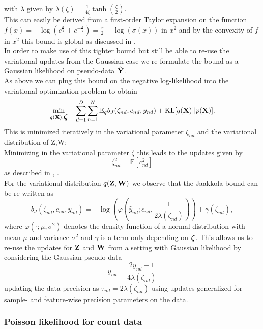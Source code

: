 with $\lambda$ given by $\lambda(\zeta)=\frac{1}{4\zeta}\tanh\left(\frac{\zeta}{2}\right)$.\\
This can easily be derived from a first-order Taylor expansion on the function $f(x) = - \log(e^{\frac{x}{2}}+e^{-\frac{x}{2}}) = \frac{x}{2}-\log(\sigma(x))$ in $x^2$ and by the convexity of 
$f$ in $x^2$ this bound is global as discussed in \cite{Jaakkola2000}.\\
In order to make use of this tighter bound but still be able to re-use the variational updates from the Gaussian case we re-formulate the bound as a Gaussian likelihood on pseudo-data $\hat{{\bf Y}}$.\\
As above we can plug this bound on the negative log-likelihood into the variational optimization problem to obtain  \begin{equation*}
\min_{q({\bf X}),\mbox{\boldmath $\zeta$}} \quad \sum_{d=1}^{D}\sum_{n=1}^{N} \mathbb{E}_q b_J(\zeta_{nd}, c_{nd},y_{nd} ) + {\rm KL}[q({\bf X})||p({\bf X})].
\end{equation*}
This is minimized iteratively in the variational parameter $\zeta_{nd}$ and the variational distribution of Z,W:\\
Minimizing in the variational parameter $\zeta$ this leads to the updates given by
\begin{equation*}
	\zeta_{nd}^2 = \mathbb{E}[c_{nd}^2]
\end{equation*}
as described in \cite{Jaakkola2000}, \cite{Bishop2006}.\\
For the variational distribution $q({\bf Z},{\bf W})$ we observe that the Jaakkola bound can be re-written as 
\begin{equation*}
	b_J(\zeta_{nd}, c_{nd},y_{nd} ) = -\log\left(\varphi\left(\hat{y}_{nd}; c_{nd}, \frac{1}{2\lambda(\zeta_{nd})}\right)\right) + \gamma(\zeta_{nd}),
\end{equation*}
where $\varphi(\cdot; \mu, \sigma^2)$ denotes the density function of a normal distribution with mean $\mu$ and variance $\sigma^2$ and $\gamma$ is a term only depending on $\mbox{\boldmath $\zeta$}$. This allows us to re-use the updates for ${\bf Z}$ and ${\bf W}$ from a setting with Gaussian likelihood by considering the Gaussian pseudo-data 
\begin{equation*}
	\hat{y}_{nd}= \frac{2y_{nd}-1}{4 \lambda(\zeta_{nd})}
\end{equation*}
updating the data precision as $\tau_{nd} = 2\lambda(\zeta_{nd})$ using  updates generalized for sample- and feature-wise precision parameters on the data.


\subsubsection*{Poisson likelihood for count data}

